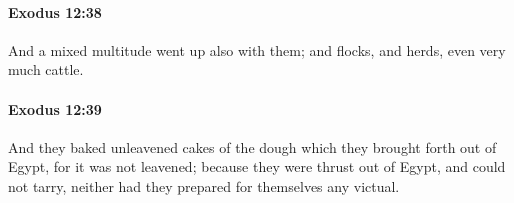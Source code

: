 		\paragraph{Exodus 12:38} %
			\label{EXODUS-12-38}

			And a mixed multitude went up also with them; and flocks, and herds, even very much cattle.


		\paragraph{Exodus 12:39} %
			\label{EXODUS-12-39}

			And they baked unleavened cakes of the dough which they brought forth out of Egypt, for it was not leavened; because they were thrust out of Egypt, and could not tarry, neither had they prepared for themselves any victual.


